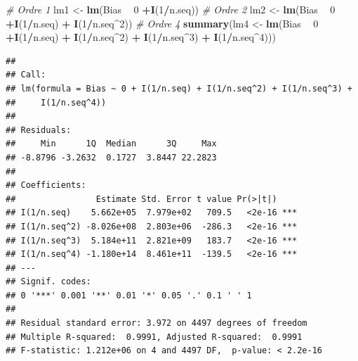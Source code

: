 \documentclass[
  11pt,
  french,
  a4paper,
  extrafontsizes,onecolumn,openright
  ]{memoir}
\newenvironment{Shaded}{\begin{snugshade}}{\end{snugshade}}
\newcommand{\CommentTok}[1]{\textcolor[rgb]{0.56,0.35,0.01}{\textit{#1}}}
\newcommand{\DecValTok}[1]{\textcolor[rgb]{0.00,0.00,0.81}{#1}}
\newcommand{\KeywordTok}[1]{\textcolor[rgb]{0.13,0.29,0.53}{\textbf{#1}}}
\newcommand{\NormalTok}[1]{#1}
\newcommand{\OperatorTok}[1]{\textcolor[rgb]{0.81,0.36,0.00}{\textbf{#1}}}
\newcommand{\StringTok}[1]{\textcolor[rgb]{0.31,0.60,0.02}{#1}}
\begin{document}
\begin{Shaded}
\begin{Highlighting}[]
\CommentTok{# Ordre 1}
\NormalTok{lm1 <-}\StringTok{ }\KeywordTok{lm}\NormalTok{(Bias }\OperatorTok{~}\StringTok{ }\DecValTok{0} \OperatorTok{+}\KeywordTok{I}\NormalTok{(}\DecValTok{1}\OperatorTok{/}\NormalTok{n.seq))}
\CommentTok{# Ordre 2}
\NormalTok{lm2 <-}\StringTok{ }\KeywordTok{lm}\NormalTok{(Bias }\OperatorTok{~}\StringTok{ }\DecValTok{0} \OperatorTok{+}\KeywordTok{I}\NormalTok{(}\DecValTok{1}\OperatorTok{/}\NormalTok{n.seq) }\OperatorTok{+}\StringTok{ }\KeywordTok{I}\NormalTok{(}\DecValTok{1}\OperatorTok{/}\NormalTok{n.seq}\OperatorTok{^}\DecValTok{2}\NormalTok{))}
\CommentTok{# Ordre 4}
\KeywordTok{summary}\NormalTok{(lm4 <-}\StringTok{ }\KeywordTok{lm}\NormalTok{(Bias }\OperatorTok{~}\StringTok{ }\DecValTok{0} \OperatorTok{+}\KeywordTok{I}\NormalTok{(}\DecValTok{1}\OperatorTok{/}\NormalTok{n.seq) }\OperatorTok{+}\StringTok{ }\KeywordTok{I}\NormalTok{(}\DecValTok{1}\OperatorTok{/}\NormalTok{n.seq}\OperatorTok{^}\DecValTok{2}\NormalTok{) }
                  \OperatorTok{+}\StringTok{ }\KeywordTok{I}\NormalTok{(}\DecValTok{1}\OperatorTok{/}\NormalTok{n.seq}\OperatorTok{^}\DecValTok{3}\NormalTok{) }\OperatorTok{+}\StringTok{ }\KeywordTok{I}\NormalTok{(}\DecValTok{1}\OperatorTok{/}\NormalTok{n.seq}\OperatorTok{^}\DecValTok{4}\NormalTok{)))}
\end{Highlighting}
\end{Shaded}

\begin{verbatim}
## 
## Call:
## lm(formula = Bias ~ 0 + I(1/n.seq) + I(1/n.seq^2) + I(1/n.seq^3) + 
##     I(1/n.seq^4))
## 
## Residuals:
##     Min      1Q  Median      3Q     Max 
## -8.8796 -3.2632  0.1727  3.8447 22.2823 
## 
## Coefficients:
##                Estimate Std. Error t value Pr(>|t|)    
## I(1/n.seq)    5.662e+05  7.979e+02   709.5   <2e-16 ***
## I(1/n.seq^2) -8.026e+08  2.803e+06  -286.3   <2e-16 ***
## I(1/n.seq^3)  5.184e+11  2.821e+09   183.7   <2e-16 ***
## I(1/n.seq^4) -1.180e+14  8.461e+11  -139.5   <2e-16 ***
## ---
## Signif. codes:  
## 0 '***' 0.001 '**' 0.01 '*' 0.05 '.' 0.1 ' ' 1
## 
## Residual standard error: 3.972 on 4497 degrees of freedom
## Multiple R-squared:  0.9991, Adjusted R-squared:  0.9991 
## F-statistic: 1.212e+06 on 4 and 4497 DF,  p-value: < 2.2e-16
\end{verbatim}

\normalsize



\scriptsize
\end{document}
